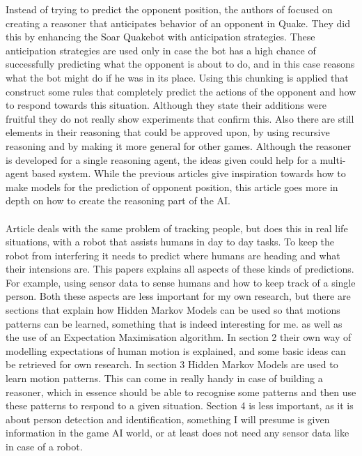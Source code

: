 \documentclass{article}
\begin{document}
Instead of trying to predict the opponent position, the authors of \citep{Laird:2001:KYG:375735.376343} focused on creating a reasoner that anticipates behavior of an opponent in Quake. They did this by enhancing the Soar Quakebot with anticipation strategies. These anticipation strategies are used only in case the bot has a high chance of successfully predicting what the opponent is about to do, and in this case reasons what the bot might do if he was in its place. Using this chunking is applied that construct some rules that completely predict the actions of the opponent and how to respond towards this situation. Although they state their additions were fruitful they do not really show experiments that confirm this. Also there are still elements in their reasoning that could be approved upon, by using recursive reasoning and by making it more general for other games. Although the reasoner is developed for a single reasoning agent, the ideas given could help for a multi-agent based system. While the previous articles give inspiration towards how to make models for the prediction of opponent position, this article goes more in depth on how to create the reasoning part of the AI. 
\\\\
Article \citep{Bennewitz05learningmotion} deals with the same problem of tracking people, but does this in real life situations, with a robot that assists humans in day to day tasks. To keep the robot from interfering it needs to predict where humans are heading and what their intensions are. This papers explains all aspects of these kinds of predictions. For example, using sensor data to sense humans and how to keep track of a single person. Both these aspects are less important for my own research, but there are sections that explain how Hidden Markov Models can be used so that motions patterns can be learned, something that is indeed interesting for me. as well as the use of an Expectation Maximisation algorithm. In section 2 their own way of modelling expectations of human motion is explained, and some basic ideas can be retrieved for own research. In section 3 Hidden Markov Models are used to learn motion patterns. This can come in really handy in case of building a reasoner, which in essence should be able to recognise some patterns and then use these patterns to respond to a given situation. Section 4 is less important, as it is about person detection and identification, something I will presume is given information in the game AI world, or at least does not need any sensor data like in case of a robot.
\end{document}
